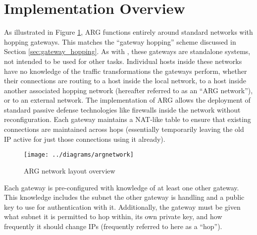 
\section{Implementation Overview}

\par As illustrated in Figure \ref{fig:argnetwork}, \ac{ARG} functions entirely around standard networks with hopping gateways. This matches the ``gateway hopping'' scheme discussed in Section \ref{sec:gateway_hopping}. As with \cite{TAO}, these gateways are standalone systems, not intended to be used for other tasks. Individual hosts inside these networks have no knowledge of the traffic transformations the gateways perform, whether their connections are routing to a host inside the local network, to a host inside another associated hopping network (hereafter referred to as an ``ARG network''), or to an external network. The implementation of ARG allows the deployment of standard passive defense technologies like firewalls inside the network without reconfiguration. Each gateway maintains a \ac{NAT}-like table to ensure that existing connections are maintained across hops (essentially temporarily leaving the old IP active for just those connections using it already).

\begin{figure}
	\centering
	\texttt{[image: ../diagrams/argnetwork]}
	\caption{ARG network layout overview}
	\label{fig:argnetwork}
\end{figure}

\par Each gateway is pre-configured with knowledge of at least one other gateway. This knowledge includes the subnet the other gateway is handling and a public key to use for authentication with it. Additionally, the gateway must be given what subnet it is permitted to hop within, its own private key, and how frequently it should change IPs (frequently referred to here as a ``hop'').

